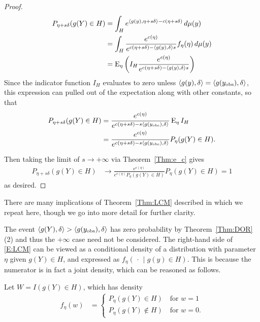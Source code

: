 \begin{proof}
\begin{align*}
 P_{\eta+s\delta}(g(Y) \in H) &= \int_H e^{\langle g(y), \eta+s\delta \rangle - c(\eta
+s\delta)} \, d\mu(y) \\
		&= \int_H  \frac{e^{c(\eta)}}{e^{c(\eta+s\delta)-\langle g(y),\delta \rangle s}} 
					f_\eta(\eta) \, d\mu(y)\\
		&= \operatorname{E}_\eta  \left ( I_H \frac{e^{c(\eta)}}{e^{c(\eta+s\delta)-\langle g(y),\delta \rangle s}} \right )
\end{align*}
Since the indicator function $I_H$ evaluates to zero unless 
$\langle  g(y), \delta \rangle = \langle  g(y_{\text{obs}}), \delta \rangle $,  
this expression can pulled out of the expectation along with other constants, so that 
\begin{align*}
		 P_{\eta+s\delta}(g(Y) \in H)
		 &= \frac{e^{c(\eta)} }{ e^{ c(\eta+s\delta) -s\langle g(y_{\text{obs}}),\delta \rangle } }
		 \operatorname{E}_\eta  I_H   \\
		 &= \frac{e^{c(\eta)} }{ e^{ c(\eta+s\delta) -s\langle g(y_{\text{obs}}),\delta \rangle } }
		 P_\eta  (g(Y) \in H). 
		 \end{align*}
 
Then taking the limit of $s \to +\infty$ via Theorem~\ref{Thm:e_c} gives
\begin{align*}
 P_{\eta+s\delta}(g(Y) \in H)
		&\to \frac{e^{c(\eta)}}{ e^{c(\eta)} P_\eta (g(Y) \in H) } P_\eta (g(Y)\in H) = 1
 \end{align*}
 as desired.   
\end{proof}


There are many implications of Theorem~\ref{Thm:LCM} described in \citep{Geyer:gdor}
which we repeat here, though we go into more detail for further clarity.

The event $\langle g(Y),\delta \rangle > \langle g(y_{\text{obs}}),\delta \rangle$ has zero probability by 
Theorem~\ref{Thm:DOR}(2) and thus the $+\infty$ case need not be considered.
The right-hand side of \eqref{E:LCM} can be viewed as a conditional density of a 
distribution with parameter $\eta$ given $g(Y) \in H$, and expressed as $f_{\eta}
(\, \cdot\,  \mid g(y) \in H)$.  This is because the numerator
is in fact a joint density, which can be reasoned as follows.

Let $W = I(g(Y) \in H)$, which has density 
\begin{align*}
	f_\eta(w) &= \begin{cases}
					P_\eta(g(Y) \in H) \quad \text{for $w=1$} \\
					P_\eta(g(Y) \notin H) \quad \text{for $w=0$}.
				\end{cases}
\end{align*}

